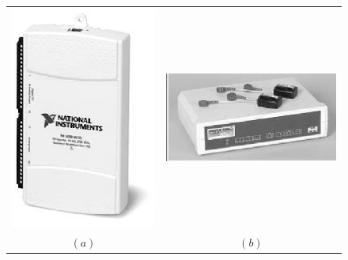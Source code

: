 \documentclass{article}
\begin{document}

\begin{figure}[!ht] \centering
  \begin{tabular}{cc}
    \includegraphics[height=0.15\textheight]{NI-6211.eps} &
    \includegraphics[height=0.15\textheight]{Zero_Base.eps} \\
  $(a)$ & $(b)$\\
  \end{tabular}
\end{figure}
\end{document}
